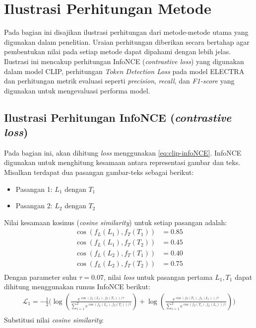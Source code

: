 \section{Ilustrasi Perhitungan Metode} \label{sec:ilustrasi_perhitungan_metode}
Pada bagian ini disajikan ilustrasi perhitungan dari metode-metode utama yang digunakan dalam penelitian. Uraian perhitungan diberikan secara bertahap agar  pembentukan nilai pada setiap metode dapat dipahami dengan lebih jelas. Ilustrasi ini mencakup perhitungan InfoNCE (\textit{contrastive loss}) yang digunakan dalam model CLIP, perhitungan \textit{Token Detection Loss} pada model ELECTRA dan perhitungan metrik evaluasi seperti \textit{precision}, \textit{recall}, dan \textit{F1-score} yang digunakan untuk mengevaluasi performa model.


\subsection{Ilustrasi Perhitungan InfoNCE (\textit{contrastive loss})} \label{subsec:ilustrasi_perhitungan_infonce}
Pada bagian ini, akan dihitung \textit{loss} menggunakan \ref{eq:clip-infoNCE}. InfoNCE digunakan untuk menghitung kesamaan antara representasi gambar dan teks. 
Misalkan terdapat dua pasangan gambar-teks sebagai berikut:
\begin{itemize}
    \item Pasangan 1: $L_1$ dengan $T_1$
    \item Pasangan 2: $L_2$ dengan $T_2$
\end{itemize}

\medskip
Nilai kesamaan kosinus (\textit{cosine similarity}) untuk setiap pasangan adalah:
\bigskip
\begin{align*}
    \cos(f_L(L_1), f_T(T_1)) &= 0.85 \\
    \cos(f_L(L_1), f_T(T_2)) &= 0.45 \\
    \cos(f_L(L_2), f_T(T_1)) &= 0.40 \\
    \cos(f_L(L_2), f_T(T_2)) &= 0.75 \\
\end{align*}
Dengan parameter suhu $\tau = 0.07$, nilai \textit{loss} untuk pasangan pertama $L_1, T_1$ dapat dihitung menggunakan rumus InfoNCE berikut:\\
\bigskip
\begin{align*}
\mathcal{L}_1 = - \frac{1}{2} \Bigg(
    \log \left( \frac{e^{\cos(f_L(L_1), f_T(T_1)) / \tau}}
    {\sum_{i=1}^{2} e^{\cos(f_L(L_1), f_T(T_i)) / \tau}} \right)
    + \log \left( \frac{e^{\cos(f_T(T_1), f_L(L_1)) / \tau}}
    {\sum_{i=1}^{2} e^{\cos(f_T(T_1), f_L(L_i)) / \tau}} \right)
\Bigg)\\
\end{align*}
Substitusi nilai \textit{cosine similarity}:

